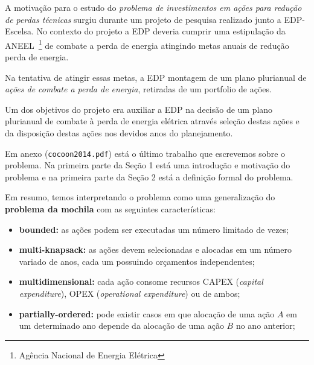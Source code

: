 \documentclass{article}
\begin{document}


A motivação para o estudo do \emph{problema de investimentos em ações para
redução de perdas técnicas} surgiu durante um projeto de pesquisa realizado
junto a EDP-Escelsa.
No contexto do projeto a EDP deveria cumprir uma estipulação da ANEEL~\footnote{
Agência Nacional de Energia Elétrica} de combate a perda de energia atingindo
metas anuais de redução perda de energia.

Na tentativa de atingir essas metas, a EDP montagem de um plano plurianual de
\emph{ações de combate a perda de energia}, retiradas de um portfolio de ações.

Um dos objetivos do projeto era auxiliar a EDP na decisão de um plano plurianual
de combate à perda de energia
elétrica através seleção destas ações e da disposição destas ações nos devidos
anos do planejamento.

Em anexo (\texttt{cocoon2014.pdf}) está o último trabalho que escrevemos sobre o problema.
Na primeira parte da Seção 1 está uma introdução e motivação do problema e na
primeira parte da Seção 2 está a definição formal do problema.


Em resumo, temos interpretando o problema como uma generalização do
{\bf problema da mochila} com as seguintes características:
\begin{itemize}
  \item {\bf bounded:} as ações podem ser executadas um número limitado de vezes;
  \item {\bf multi-knapsack:} as ações devem selecionadas e alocadas em um número
    variado de anos, cada um possuindo orçamentos independentes;
  \item {\bf multidimensional:} cada ação consome recursos CAPEX
    (\textit{capital expenditure}), OPEX (\textit{operational expenditure})
	ou de ambos;
  \item {\bf partially-ordered:} pode existir casos em que alocação de uma
    ação $A$ em um determinado ano depende da alocação de uma ação $B$ no ano
	anterior;
\end{itemize}
\end{document}
